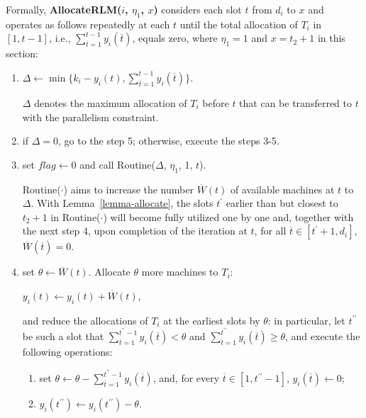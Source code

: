 \documentclass[10pt,journal,compsoc]{IEEEtran}
\begin{document}
Formally, \textbf{AllocateRLM($i$, $\eta_{1}$, $x$)} considers each slot $t$ from $d_{i}$ to $x$ and operates as follows repeatedly at each $t$ until the total allocation of $T_{i}$ in $[1, t-1]$, i.e., $\sum_{\overline{t}=1}^{t-1}{y_{i}(\overline{t})}$, equals zero, where $\eta_{1}=1$ and $x=t_{2}+1$ in this section:
\begin{enumerate}
 \setlength\itemsep{0.1em}

  \item  $\Delta\leftarrow \min\{k_{i}-y_{i}(t), \sum_{\overline{t}=1}^{t-1}{y_{i}(\overline{t})}\}$.

        \setlength{\parindent}{1em}\vspace{0.01em}{\em Notes.} $\Delta$ denotes the maximum allocation of $T_{i}$ before $t$ that can be transferred to $t$ with the parallelism constraint.

  \item if $\Delta=0$, go to the step 5; otherwise, execute the steps 3-5.

  \item set $flag \leftarrow 0$ and call Routine($\Delta$, $\eta_{1}$, 1, $t$).

      \setlength{\parindent}{1em}\vspace{0.01em}{\em Notes.} Routine($\cdot$) aims to increase the number $\overline{W}(t)$ of available machines at $t$ to $\Delta$. With Lemma~\ref{lemma-allocate}, the slots $t^{\prime}$ earlier than but closest to $t_{2}+1$ in Routine($\cdot$) will become fully utilized one by one and, together with the next step 4, upon completion of the iteration at $t$, for all $\overline{t}\in \left[ t^{\prime}+1, d_{i} \right]$, $\overline{W}(\overline{t})=0$.


  \item set $\theta\leftarrow\overline{W}(t)$. Allocate $\theta$ more machines to $T_{i}$:
  \begin{center}
  $y_{i}(t)\leftarrow y_{i}(t)+\overline{W}(t)$,
  \end{center}
   and reduce the allocations of $T_{i}$ at the earliest slots by $\theta$: in particular, let $t^{\prime\prime}$ be such a slot that $\sum_{\overline{t}=1}^{t^{\prime\prime}-1}{y_{i}(\overline{t})}<\theta$ and $\sum_{\overline{t}=1}^{t^{\prime\prime}}{y_{i}(\overline{t})}\geq \theta$, and execute the following operations:
      \begin{enumerate}
 \setlength\itemsep{0.15em}
        \item set $\theta\leftarrow \theta-\sum_{\overline{t}=1}^{t^{\prime\prime}-1}{y_{i}(\overline{t})}$, and, for every $\overline{t} \in [ 1, t^{\prime\prime}-1]$, $y_{i}(\overline{t})\leftarrow 0$;
        \item $y_{i}(t^{\prime\prime})\leftarrow y_{i}(t^{\prime\prime})-\theta$.
      \end{enumerate}


\end{enumerate}
\end{document}
